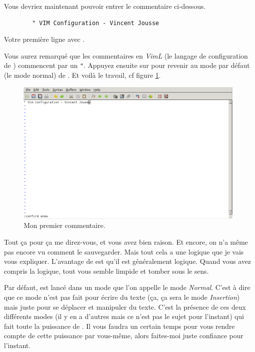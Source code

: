 Vous devriez maintenant pouvoir entrer le commentaire ci-dessous.
\begin{listing}[H]

    \begin{verbatim}
        " VIM Configuration - Vincent Jousse
    \end{verbatim}
    \caption{Votre première ligne avec \vim.}
    \label{code:first-comment}
\end{listing}

Vous aurez remarqué que les commentaires en \emph{VimL} (le langage de configuration de \vim) commencent par un \Verb|"|. Appuyez ensuite sur \ttesc pour revenir au mode par défaut (le mode normal) de \vim. Et voilà le travail, cf figure \ref{fig:vim-first-comment}.

\begin{figure}%
  \includegraphics[width=\linewidth]{graphics/vim-first-comment.png}
  \caption{Mon premier commentaire.}
  \label{fig:vim-first-comment}
\end{figure}

Tout ça pour ça me direz-vous, et vous avez bien raison. Et encore, on n'a même pas encore vu comment le sauvegarder. Mais tout cela a une logique que je vais vous expliquer. L'avantage de \vim est qu'il est généralement logique. Quand vous avez compris la logique, tout vous semble limpide et tomber sous le sens.

Par défaut, \vim est lancé dans un mode que l'on appelle le mode \emph{Normal}. C'est à dire que ce mode n'est pas fait pour écrire du texte (ça, ça sera le mode \emph{Insertion}) mais juste pour se déplacer et manipuler du texte. C'est la présence de ces deux différents modes (il y en a d'autres mais ce n'est pas le sujet pour l'instant) qui fait toute la puissance de \vim. Il vous faudra un certain temps pour vous rendre compte de cette puissance par vous-même, alors faites-moi juste confiance pour l'instant.

